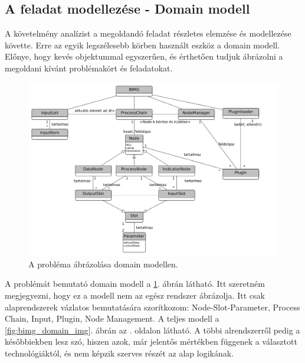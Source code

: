 \documentclass[a4paper,12pt,oneside]{report}
\begin{document}
\subsection{A feladat modellezése - Domain modell}
A követelmény analízist a megoldandó feladat részletes elemzése és modellezése követte. Erre az egyik legszélesebb körben használt eszköz a domain modell. Előnye, hogy kevés objektummal egyszerűen, és érthetően tudjuk ábrázolni a megoldani kívánt problémakört és feladatokat.\cite{book:usecase_book_brief}
\begin{center}
\begin{figure}[h]
  \includegraphics[width=1.2\textwidth]{domain_real_gray.png}
  \caption{A probléma ábrázolása domain modellen. }

  \label{fig:bimg_domain_realworld_img}
\end{figure}
\end{center}
A problémát bemutató domain modell a \ref{fig:bimg_domain_realworld_img}. ábrán látható. Itt szeretném megjegyezni, hogy ez a modell nem az egész rendszer ábrázolja. Itt csak alaprendszerek vázlatos bemutatására szorítkozom: Node-Slot-Parameter, Process Chain, Input, Plugin, Node Management. A teljes modell a \ref{fig:bimg_domain_img}. ábrán az \pageref{fig:bimg_domain_img}. oldalon látható. A többi alrendszerről pedig a későbbiekben lesz szó, hiszen azok, már jelentős mértékben függenek a választott technológiáktól, és nem képzik szerves részét az alap logikának.
\end{document}
